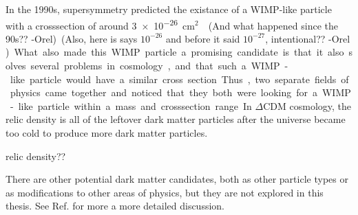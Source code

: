   In the 1990s, supersymmetry predicted the existance of a WIMP-like particle with a crosssection of around \nicetilde \SI{3e-26}{cm$^2$} \cite{Jungman:1995df}.
  {\color{red}(And what happened since the 90s?? -Orel)}
  {\color{red}(Also, here is says $10^{-26}$ and before it said $10^{-27}$, intentional?? -Orel )}
  What also made this WIMP particle a promising candidate is that it also solves several problems in cosmology, and that such a WIMP-like particle would have a similar cross section.
  Thus, two separate fields of physics came together and noticed that they both were looking for a WIMP-like particle within a mass and crosssection range.
  In $\Delta$CDM cosmology, the relic density is all of the leftover dark matter particles after the universe became too cold to produce more dark matter particles.

  {\color{red} relic density??}

  There are other potential dark matter candidates, both as other particle types or as modifications to other areas of physics, but they are not explored in this thesis.
  See Ref. \cite{DMPrimer} for more a more detailed discussion.



